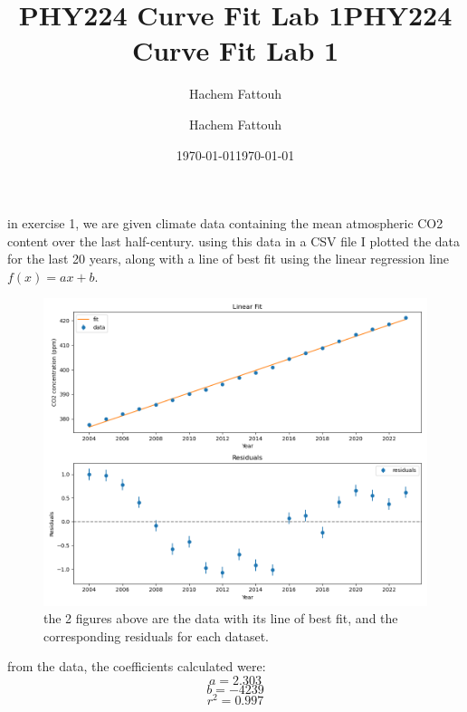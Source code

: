 \documentclass{article}
\title{PHY224 Curve Fit Lab 1}
\author{Hachem Fattouh}
\date{\today}
\title{PHY224 Curve Fit Lab 1}
\author{Hachem Fattouh}
\date{\today}
\begin{document}
\maketitle

in exercise 1, we are given climate data containing the mean atmospheric CO2 content over the last half-century. using this data in a CSV file I plotted the data
for the last 20 years, along with a line of best fit using the linear regression line \(f(x) = ax + b\).

\begin{figure}[h]
    \centering
    \includegraphics[width=\textwidth]{Exercise 1.png} 
    \caption{the 2 figures above are the data with its line of best fit,
    and the corresponding residuals for each dataset.}
    \label{fig:fit_and_residuals}
\end{figure}


from the data, the coefficients calculated were:
\[a = 2.303\]
\[b = -4239\]
\[r^2 = 0.997\]
\end{document}
